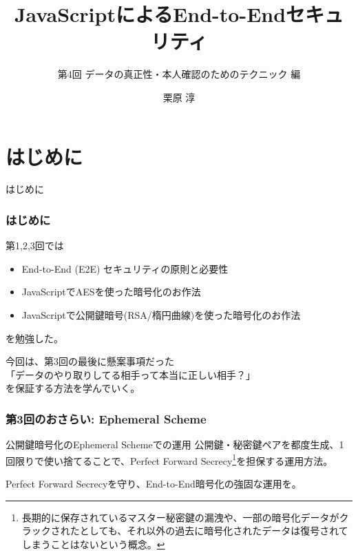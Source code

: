 \documentclass[12pt,dvipdfmx]{beamer}
\title[E2E Security with JS 04]{JavaScriptによるEnd-to-Endセキュリティ}
\subtitle{第4回 データの真正性・本人確認のためのテクニック 編}
\author[Jun Kurihara]{栗原 淳}
\institute[]{}
\date[]{}
\begin{document}
\begin{frame}
\titlepage
\end{frame}

\section{はじめに}
\begin{frame}
 \centering
 {\Large はじめに}
\end{frame}

\begin{frame}
\frametitle{はじめに}
第1,2,3回では
\begin{itemize}
 \item End-to-End (E2E) セキュリティの原則と必要性
 \item JavaScriptでAESを使った暗号化のお作法
 \item JavaScriptで公開鍵暗号(RSA/楕円曲線)を使った暗号化のお作法
\end{itemize}
を勉強した。

\vspace{2ex}

今回は、第3回の最後に懸案事項だった\\
\alert{「データのやり取りしてる相手って本当に正しい相手？」}\\
を保証する方法を学んでいく。
\end{frame}


\begin{frame}
\frametitle{第3回のおさらい: Ephemeral Scheme}
\begin{block}{\small 公開鍵暗号化のEphemeral Schemeでの運用}
公開鍵・秘密鍵ペアを都度生成、1回限りで使い捨てることで、\alert{Perfect Forward Secrecy}\footnote[frame]{\scriptsize 長期的に保存されているマスター秘密鍵の漏洩や、一部の暗号化データがクラックされたとしても、\alert{それ以外の過去に暗号化されたデータは復号されてしまうことはない}という概念。}を担保する運用方法。
\end{block}

Perfect Forward Secrecyを守り、End-to-End暗号化の強固な運用を。
\end{frame}
\end{document}
